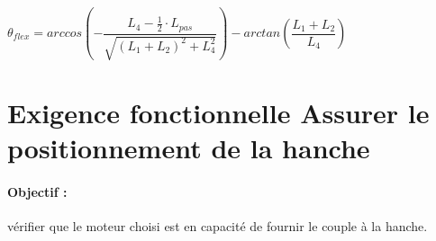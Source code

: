 \begin{center}
$\theta_{flex}=arccos\left(-\dfrac{L_4-\frac{1}{2}\cdot L_{pas}}{\sqrt{(L_1+L_2)^2+L_4^2}}\right)-arctan\left(\dfrac{L_1+L_2}{L_4}\right)$
\end{center}

%
%
%
%
%
%
%
%
%

\newpage

\section{Exigence fonctionnelle \og Assurer le positionnement de la hanche\fg}


\paragraph{Objectif :} vérifier que le moteur choisi est en capacité de fournir le couple à la hanche.


